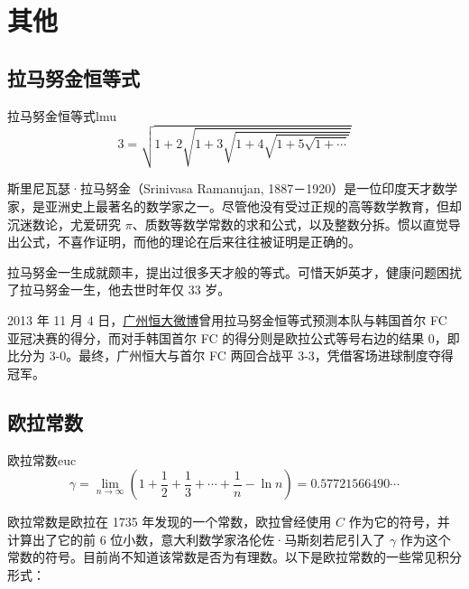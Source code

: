 \documentclass[12pt, cn]{elegantart}
\begin{document}
\section{其他}

\subsection{拉马努金恒等式}

\begin{theorem}{拉马努金恒等式}{lmu}
	\begin{equation}
		3=\sqrt{1+2 \sqrt{1+3 \sqrt{1+4 \sqrt{1+5 \sqrt{1+\cdots}}}}}
	\end{equation}
\end{theorem}

	斯里尼瓦瑟·拉马努金（Srinivasa Ramanujan, 1887－1920）是一位印度天才数学家，是亚洲史上最著名的数学家之一。尽管他没有受过正规的高等数学教育，但却沉迷数论，尤爱研究 $\pi$、质数等数学常数的求和公式，以及整数分拆。惯以直觉导出公式，不喜作证明，而他的理论在后来往往被证明是正确的。

	拉马努金一生成就颇丰，提出过很多天才般的等式。可惜天妒英才，健康问题困扰了拉马努金一生，他去世时年仅 33 岁。
	
	2013 年 11 月 4 日，\href{https://www.weibo.com/1894798092/Ah8QTrRae}{广州恒大微博}曾用拉马努金恒等式预测本队与韩国首尔 FC 亚冠决赛的得分，而对手韩国首尔 FC 的得分则是欧拉公式等号右边的结果 0，即比分为 3-0。最终，广州恒大与首尔 FC 两回合战平 3-3，凭借客场进球制度夺得冠军。

\subsection{欧拉常数}

\begin{theorem}{欧拉常数}{euc}
\begin{equation}
		\gamma=\lim _{n \rightarrow \infty}\left( 1+\frac{1}{2}+\frac{1}{3}+\cdots+\frac{1}{n} -\ln n\right)=0.57721566490\cdots
\end{equation}
\end{theorem}


欧拉常数是欧拉在 1735 年发现的一个常数，欧拉曾经使用 $C$ 作为它的符号，并计算出了它的前 6 位小数，意大利数学家洛伦佐·马斯刻若尼引入了 $\gamma$ 作为这个常数的符号。目前尚不知道该常数是否为有理数。以下是欧拉常数的一些常见积分形式：
\end{document}
